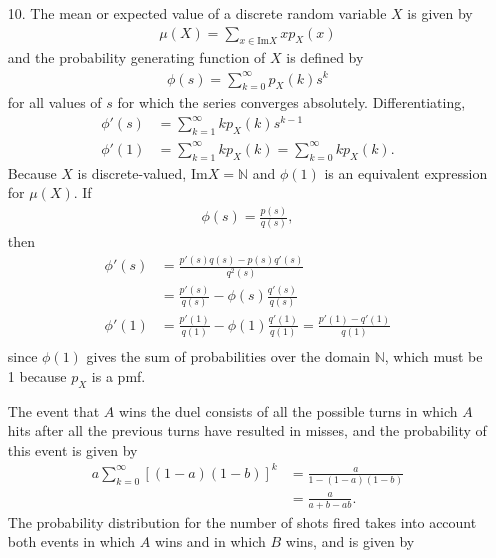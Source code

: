 \documentclass[a4paper,12pt]{article}
\begin{document}
\begin{enumerate}
    \item[10.] 
        The mean or expected value of a discrete random variable $X$ is given by
        \begin{align*}
            \mu(X) = \sum_{x \in \text{Im} X} x p_X(x)
        \end{align*}
        and the probability generating function of $X$ is defined by
        \begin{align*}
            \phi(s) = \sum_{k = 0}^{\infty} p_X(k) s^k
        \end{align*}
        for all values of $s$ for which the series converges absolutely. Differentiating,
        \begin{align*}
            \phi'(s) &= \sum_{k = 1}^{\infty} k p_X(k) s^{k - 1} \\
            \phi'(1) &= \sum_{k = 1}^{\infty} k p_X(k) = \sum_{k = 0}^{\infty} k p_X(k).
        \end{align*}
        Because $X$ is discrete-valued, $\text{Im} X = \mathbb{N}$ and $\phi(1)$ is an equivalent expression for $\mu(X)$. If
        \begin{align*}
            \phi(s) = \frac{p(s)}{q(s)},
        \end{align*}
        then
        \begin{align*}
            \phi'(s) &= \frac{p'(s)q(s) - p(s)q'(s)}{q^2(s)} \\
            &= \frac{p'(s)}{q(s)} - \phi(s) \frac{q'(s)}{q(s)} \\
            \phi'(1) &= \frac{p'(1)}{q(1)} - \phi(1) \frac{q'(1)}{q(1)} = \frac{p'(1) - q'(1)}{q(1)} \\
        \end{align*}
        since $\phi(1)$ gives the sum of probabilities over the domain $\mathbb{N}$, which must be 1 because $p_X$ is a pmf. \par
        The event that $A$ wins the duel consists of all the possible turns in which $A$ hits after all the previous turns have resulted in misses, and the probability of this event is given by
        \begin{align*}
            a \sum_{k = 0}^{\infty} [(1 - a)(1 - b)]^k &= \frac{a}{1 - (1 - a)(1 - b)} \\
            &= \frac{a}{a + b - ab}.
        \end{align*}
        The probability distribution for the number of shots fired takes into account both events in which $A$ wins and in which $B$ wins, and is given by
        \begin{align*}

\end{align*}
\end{enumerate}
\end{document}
